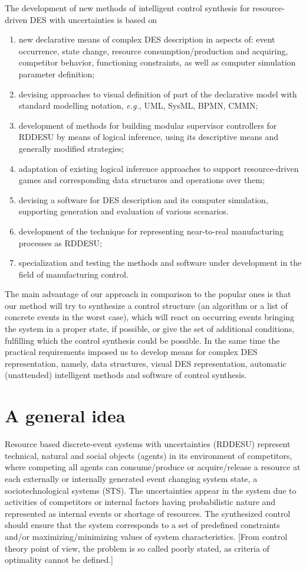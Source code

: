 \documentclass[conference]{IEEEtran}
\begin{document}
The development of new methods of intelligent control synthesis for resource-driven DES with uncertainties is based on
\begin{enumerate}
\item new declarative means of complex DES description in aspects of: event occurrence, state change, resource consumption/production and acquiring, competitor behavior, functioning constraints, as well as computer simulation parameter definition;
\item devising approaches to visual definition of part of the declarative model with standard modelling notation, \emph{e.g.}, UML, SysML, BPMN, CMMN;
\item development of methods for building modular supervisor controllers for RDDESU by means of logical inference, using its descriptive means and generally modified strategies;
\item adaptation of existing logical inference approaches to support resource-driven games and corresponding data structures and operations over them;
\item devising a software for DES description and its computer simulation, supporting generation and evaluation of various scenarios.
\item development of the technique for representing near-to-real manufacturing processes as RDDESU;
\item specialization and testing the methods and software under development in the field of manufacturing control.
\end{enumerate}

The main advantage of our approach in comparison to the popular ones is that our method will try to synthesize a control structure (an algorithm or a list of concrete events in the worst case), which will react on occurring events bringing the system in a proper state, if possible, or give the set of additional conditions, fulfilling which the control synthesis could be possible. In the same time the practical requirements imposed us to develop means for complex DES representation, namely, data structures, visual DES representation, automatic (unattended) intelligent methods and software of control synthesis.

\section{A general idea}
\label{sec:idea}

Resource based discrete-event systems with uncertainties (RDDESU) represent technical, natural and social objects (agents) in its environment of competitors, where competing all agents can consume/produce or acquire/release a resource at each externally or internally generated event changing system state, a sociotechnological systems (STS). The uncertainties appear in the system due to activities of competitors or internal factors having probabilistic nature and represented as internal events or shortage of resources. The synthesized control should ensure that the system corresponds to a set of predefined constraints and/or maximizing/minimizing values of system characteristics. [From control theory point of view, the problem is so called poorly stated, as criteria of optimality cannot be defined.]
\end{document}
